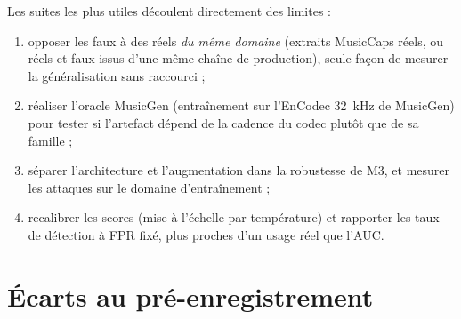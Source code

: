 \documentclass[a4paper, 11pt]{article}
\begin{document}
Les suites les plus utiles découlent directement des limites :
\begin{enumerate}
    \item opposer les faux à des réels \emph{du même domaine} (extraits MusicCaps réels, ou réels et faux
    issus d'une même chaîne de production), seule façon de mesurer la généralisation sans raccourci ;
    \item réaliser l'oracle MusicGen (entraînement sur l'EnCodec 32~kHz de MusicGen) pour tester si
    l'artefact dépend de la cadence du codec plutôt que de sa famille ;
    \item séparer l'architecture et l'augmentation dans la robustesse de M3, et mesurer les attaques sur le
    domaine d'entraînement ;
    \item recalibrer les scores (mise à l'échelle par température) et rapporter les taux de détection à
    FPR fixé, plus proches d'un usage réel que l'AUC.
\end{enumerate}

\printbibliography[heading=bibintoc, title={Références}]

\newpage
\appendix

\section{Écarts au pré-enregistrement}
\label{app:ecarts}
\end{document}
